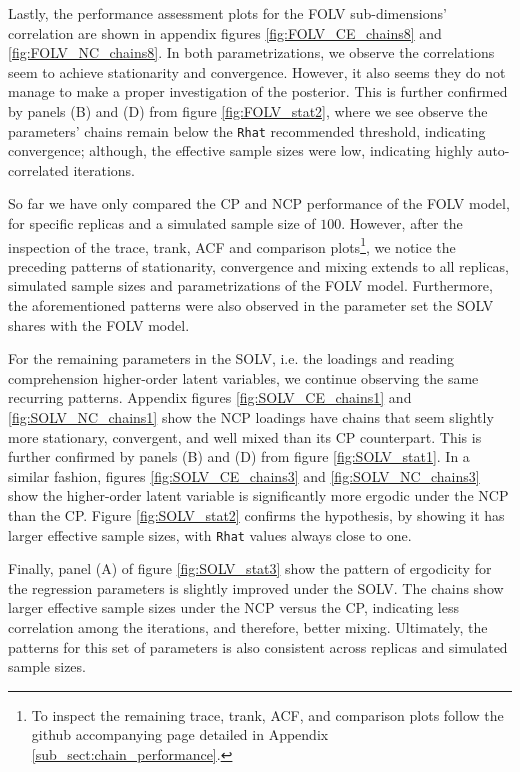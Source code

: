 Lastly, the performance assessment plots for the FOLV sub-dimensions' correlation are shown in appendix figures \ref{fig:FOLV_CE_chains8} and \ref{fig:FOLV_NC_chains8}. In both parametrizations, we observe the correlations seem to achieve stationarity and convergence. However, it also seems they do not manage to make a proper investigation of the posterior. This is further confirmed by panels (B) and (D) from figure \ref{fig:FOLV_stat2}, where we see observe the parameters' chains remain below the \texttt{Rhat} recommended threshold, indicating convergence; although, the effective sample sizes were low, indicating highly auto-correlated iterations.

So far we have only compared the CP and NCP performance of the FOLV model, for specific replicas and a simulated sample size of $100$. However, after the inspection of the trace, trank, ACF and comparison plots\footnote{To inspect the remaining trace, trank, ACF, and comparison plots follow the github accompanying page detailed in Appendix \ref{sub_sect:chain_performance}.}, we notice the preceding patterns of stationarity, convergence and mixing extends to all replicas, simulated sample sizes and parametrizations of the FOLV model. Furthermore, the aforementioned patterns were also observed in the parameter set the SOLV shares with the FOLV model. 

For the remaining parameters in the SOLV, i.e. the loadings and reading comprehension higher-order latent variables, we continue observing the same recurring patterns. Appendix figures \ref{fig:SOLV_CE_chains1} and \ref{fig:SOLV_NC_chains1} show the NCP loadings have chains that seem slightly more stationary, convergent, and well mixed than its CP counterpart. This is further confirmed by panels (B) and (D) from figure \ref{fig:SOLV_stat1}. In a similar fashion, figures \ref{fig:SOLV_CE_chains3} and \ref{fig:SOLV_NC_chains3} show the higher-order latent variable is significantly more ergodic under the NCP than the CP. Figure \ref{fig:SOLV_stat2} confirms the hypothesis, by showing it has larger effective sample sizes, with \texttt{Rhat} values always close to one.

Finally, panel (A) of figure \ref{fig:SOLV_stat3} show the pattern of ergodicity for the regression parameters is slightly improved under the SOLV. The chains show larger effective sample sizes under the NCP versus the CP, indicating less correlation among the iterations, and therefore, better mixing. Ultimately, the patterns for this set of parameters is also consistent across replicas and simulated sample sizes.

